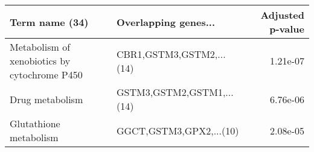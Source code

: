 \begin{tabular}{llr}
\toprule
                              Term name (34) &      Overlapping genes... &  Adjusted p-value \\
\midrule
Metabolism of xenobiotics by cytochrome P450 &  CBR1,GSTM3,GSTM2,...(14) &          1.21e-07 \\
                             Drug metabolism & GSTM3,GSTM2,GSTM1,...(14) &          6.76e-06 \\
                      Glutathione metabolism &   GGCT,GSTM3,GPX2,...(10) &          2.08e-05 \\
\bottomrule
\end{tabular}
